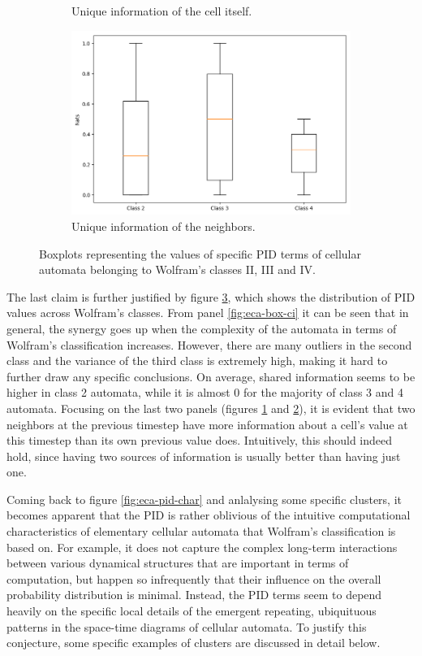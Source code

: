\documentclass[12pt]{article}
\begin{document}
\begin{figure} [!h]
\begin{subfigure}{.5\textwidth}
  \caption{Unique information of the cell itself.}
  \label{fig:eca-box-ui-y}
\end{subfigure}
\begin{subfigure}{.5\textwidth}
  \centering
  \includegraphics[width=.9\linewidth]{eca-box-ui-z}
  \caption{Unique information of the neighbors.}
  \label{fig:eca-box-ui-z}
\end{subfigure}
\caption{Boxplots representing the values of specific PID terms of cellular automata belonging to Wolfram's classes II, III and IV.}
\label{fig:eca-boxplots}
\end{figure}

The last claim is further justified by figure \ref{fig:eca-boxplots}, which shows the distribution of PID values across Wolfram's classes. From panel \ref{fig:eca-box-ci} it can be seen that in general, the synergy goes up when the complexity of the automata in terms of Wolfram's classification increases. However, there are many outliers in the second class and the variance of the third class is extremely high, making it hard to further draw any specific conclusions. On average, shared information seems to be higher in class 2 automata, while it is almost 0 for the majority of class 3 and 4 automata. Focusing on the last two panels (figures \ref{fig:eca-box-ui-y} and \ref{fig:eca-box-ui-z}), it is evident that two neighbors at the previous timestep have more information about a cell's value at this timestep than its own previous value does. Intuitively, this should indeed hold, since having two sources of information is usually better than having just one. 

Coming back to figure \ref{fig:eca-pid-char} and anlalysing some specific clusters, it becomes apparent that the PID is rather oblivious of the intuitive computational characteristics of elementary cellular automata that Wolfram's classification is based on. For example, it does not capture the complex long-term interactions between various dynamical structures that are important in terms of computation, but happen so infrequently that their influence on the overall probability 	distribution is minimal. Instead, the PID terms seem to depend heavily on the specific local details of the emergent repeating, ubiquituous patterns in the space-time diagrams of cellular automata. To justify this conjecture, some specific examples of clusters are discussed in detail below. 
\end{document}
